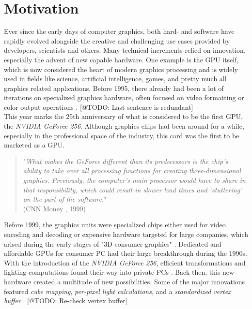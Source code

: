 \chapter{Motivation} \label{cpt-motivation}


Ever since the early days of computer graphics, both hard- and software have rapidly evolved
alongside the creative and challenging use cases provided by developers, scientists and others.
Many technical increments relied on innovation, especially the advent of new capable hardware.
One example is the \ac{GPU} itself, which is now considered the heart of modern graphics 
processing and is widely used in fields like science, artificial intelligence, games, and pretty 
much all graphics related applications. Before 1995, there already had been a lot of iterations 
on specialized graphics hardware, often focused on video formatting or color output operations
\cite{Singer2023}. [@TODO: Last sentence is redundant]\\

This year marks the 25th anniversary of what is considered to be the first \ac{GPU}, the 
\emph{NVIDIA GeForce 256}. Although graphics chips had been around for a while, especially 
in the professional space of the industry, this card was the first to be marketed as a \ac{GPU}. 

\begin{quote}
    "\emph{What makes the GeForce different than its predecessors is the chip's ability to take over all 
    processing functions for creating three-dimensional graphics. Previously, the computer's main 
    processor would have to share in that responsibility, which could result in slower load times 
    and 'stuttering' on the part of the software.}" \\  
    (CNN Money \cite{CNNMoney1999}, 1999)
\end{quote}

\noindent
Before 1999, the graphics units were specialized chips either used for video encoding and decoding
or expensive hardware targeted for large companies, which arised during the early stages of "3D 
consumer graphics" \cite{Singer2023}. Dedicated and affordable \ac{GPU}s for consumer \ac{PC} had 
their large breakthrough during the 1990s. With the introduction of the \emph{NVIDIA GeForce 256}, 
efficient transformations and lighting computations found their way into private \ac{PC}s 
\cite{Fenno2024}. Back then, this new hardware created a multitude of new possibilities. Some of the 
major innovations featured \emph{cube mapping}, \emph{per-pixel light calculations}, and a 
\emph{standardized vertex buffer} \cite{NVIDIA1999, Battaglia2024}. [@TODO: Re-check vertex buffer]


